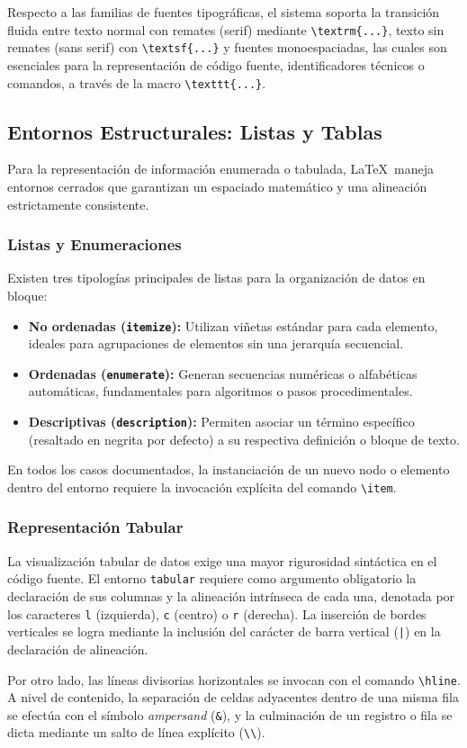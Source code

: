 Respecto a las familias de fuentes tipográficas, el sistema soporta la transición fluida entre texto normal con remates (serif) mediante \texttt{\textbackslash textrm\{...\}}, texto sin remates (sans serif) con \texttt{\textbackslash textsf\{...\}} y fuentes monoespaciadas, las cuales son esenciales para la representación de código fuente, identificadores técnicos o comandos, a través de la macro \texttt{\textbackslash texttt\{...\}}.

\subsection{Entornos Estructurales: Listas y Tablas}
Para la representación de información enumerada o tabulada, \LaTeX\ maneja entornos cerrados que garantizan un espaciado matemático y una alineación estrictamente consistente.

\subsubsection{Listas y Enumeraciones}
Existen tres tipologías principales de listas para la organización de datos en bloque:
\begin{itemize}
    \item \textbf{No ordenadas (\texttt{itemize}):} Utilizan viñetas estándar para cada elemento, ideales para agrupaciones de elementos sin una jerarquía secuencial.
    \item \textbf{Ordenadas (\texttt{enumerate}):} Generan secuencias numéricas o alfabéticas automáticas, fundamentales para algoritmos o pasos procedimentales.
    \item \textbf{Descriptivas (\texttt{description}):} Permiten asociar un término específico (resaltado en negrita por defecto) a su respectiva definición o bloque de texto.
\end{itemize}
En todos los casos documentados, la instanciación de un nuevo nodo o elemento dentro del entorno requiere la invocación explícita del comando \texttt{\textbackslash item}.

\subsubsection{Representación Tabular}
La visualización tabular de datos exige una mayor rigurosidad sintáctica en el código fuente. El entorno \texttt{tabular} requiere como argumento obligatorio la declaración de sus columnas y la alineación intrínseca de cada una, denotada por los caracteres \texttt{l} (izquierda), \texttt{c} (centro) o \texttt{r} (derecha). La inserción de bordes verticales se logra mediante la inclusión del carácter de barra vertical (\texttt{|}) en la declaración de alineación.

Por otro lado, las líneas divisorias horizontales se invocan con el comando \texttt{\textbackslash hline}. A nivel de contenido, la separación de celdas adyacentes dentro de una misma fila se efectúa con el símbolo \textit{ampersand} (\texttt{\&}), y la culminación de un registro o fila se dicta mediante un salto de línea explícito (\texttt{\textbackslash\textbackslash}).